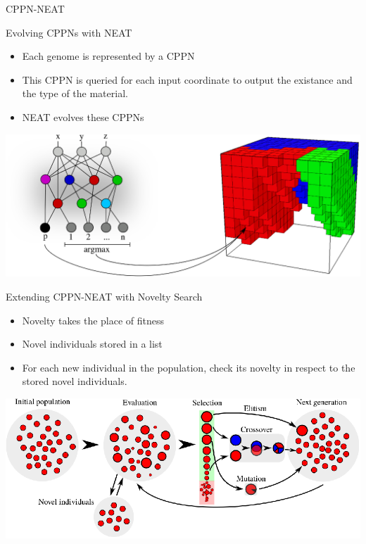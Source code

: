 \documentclass[6pt]{beamer}
\begin{document}
\begin{frame}{CPPN-NEAT}
\begin{block}{Evolving CPPNs with NEAT}
\begin{itemize}
\item Each genome is represented by a CPPN
\item This CPPN is queried for each input coordinate to output the existance and the type of the material.
\item NEAT evolves these CPPNs
\end{itemize}
\end{block}
\begin{center}
\includegraphics[height=0.4\textheight]{../Figures/Misc/cppnSoftBot2.eps}
\end{center}
\end{frame}

{

\begin{frame}{Extending CPPN-NEAT with Novelty Search~}
\begin{itemize}
\item Novelty takes the place of fitness
\item Novel individuals stored in a list
\item For each new individual in the population, check its novelty in respect to the stored novel individuals.
\end{itemize}
\begin{center}
\includegraphics[height=0.45\textheight]{../Figures/Misc/EvolutionNovelty.eps}
\end{center}
\end{frame}

}
\end{document}
